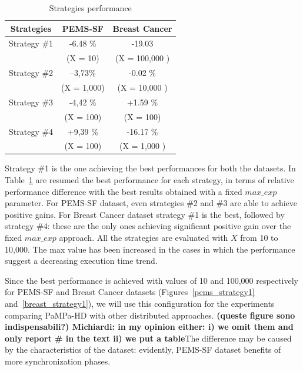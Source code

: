 \begin{table}
\begin{center}
\caption{Strategies performance}
\label{strategies_perf}
\begin{tabular}{ |c| c | c| }
\hline
 Strategies & PEMS-SF& Breast Cancer   \\ \hline \hline
  Strategy \#1 &-6.48 \%   &    -19.03 \\ 
   &
 (X = 10)  &   (X = 100,000 )   \\ \hline
  Strategy \#2 & --3,73\% &  -0.02 \%   \\ 
      & (X = 1,000)&  (X = 10,000 )    \\ \hline
  Strategy \#3 & -4,42
 \%  & +1.59 \%   \\ 
      &  (X = 100)&  (X = 100)   \\ \hline
   Strategy \#4 & +9,39
 \%
 &  -16.17 \%   \\ 
      &(X = 100) & (X = 1,000 )    \\ \hline
\end{tabular}
\end{center}
\end{table}

Strategy \#1 is the one achieving the best performances for both the datasets. In Table~\ref{strategies_perf} are resumed the best performance for each strategy, in terms of relative performance difference with the best results obtained with a fixed $max\_exp$ parameter. For PEMS-SF dataset, even strategies \#2 and \#3 are able to achieve positive gains. For Breast Cancer dataset strategy \#1 is the best, followed by strategy \#4: these are the only ones achieving significant positive gain over the fixed $max\_exp$ approach.
All the strategies are evaluated with $X$ from 10 to 10,000. The max value has been increased in the cases in which the performance suggest a decreasing execution time trend.

Since the best performance is achieved with values of 10 and 100,000 respectively for PEMS-SF and Breast Cancer datasets (Figures~\ref{pems_strategy1} and~\ref{breast_strategy1}), we will use this configuration for the experiments comparing PaMPa-HD with other distributed approaches. \textbf{(queste figure sono indispensabili?) Michiardi: in my opinion either: i) we omit them and only report \# in the text ii) we put a table}The difference may be caused by the characteristics of the dataset: evidently, PEMS-SF dataset benefits of more synchronization phases.



